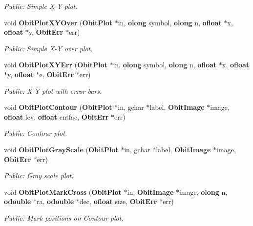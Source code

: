 \begin{CompactItemize}
\begin{CompactList}\small\item\em Public: Simple X-Y plot. \item\end{CompactList}\item 
void {\bf Obit\-Plot\-XYOver} ({\bf Obit\-Plot} $\ast$in, {\bf olong} symbol, {\bf olong} n, {\bf ofloat} $\ast$x, {\bf ofloat} $\ast$y, {\bf Obit\-Err} $\ast$err)
\begin{CompactList}\small\item\em Public: Simple X-Y over plot. \item\end{CompactList}\item 
void {\bf Obit\-Plot\-XYErr} ({\bf Obit\-Plot} $\ast$in, {\bf olong} symbol, {\bf olong} n, {\bf ofloat} $\ast$x, {\bf ofloat} $\ast$y, {\bf ofloat} $\ast$e, {\bf Obit\-Err} $\ast$err)
\begin{CompactList}\small\item\em Public: X-Y plot with error bars. \item\end{CompactList}\item 
void {\bf Obit\-Plot\-Contour} ({\bf Obit\-Plot} $\ast$in, gchar $\ast$label, {\bf Obit\-Image} $\ast$image, {\bf ofloat} lev, {\bf ofloat} cntfac, {\bf Obit\-Err} $\ast$err)
\begin{CompactList}\small\item\em Public: Contour plot. \item\end{CompactList}\item 
void {\bf Obit\-Plot\-Gray\-Scale} ({\bf Obit\-Plot} $\ast$in, gchar $\ast$label, {\bf Obit\-Image} $\ast$image, {\bf Obit\-Err} $\ast$err)
\begin{CompactList}\small\item\em Public: Gray scale plot. \item\end{CompactList}\item 
void {\bf Obit\-Plot\-Mark\-Cross} ({\bf Obit\-Plot} $\ast$in, {\bf Obit\-Image} $\ast$image, {\bf olong} n, {\bf odouble} $\ast$ra, {\bf odouble} $\ast$dec, {\bf ofloat} size, {\bf Obit\-Err} $\ast$err)
\begin{CompactList}\small\item\em Public: Mark positions on Contour plot. \item\end{CompactList}\item 

\end{CompactItemize}
